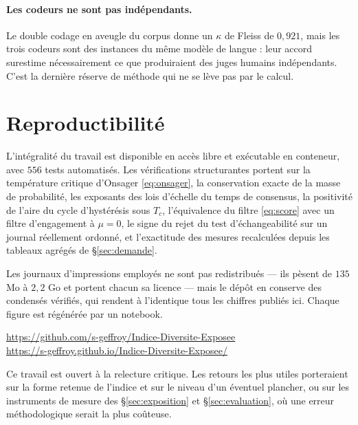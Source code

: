\documentclass[11pt,a4paper]{article}
\begin{document}
\paragraph{Les codeurs ne sont pas indépendants.} Le double codage en aveugle du corpus donne
un $\kappa$ de Fleiss de $0{,}921$, mais les trois codeurs sont des instances du même modèle de
langue : leur accord surestime nécessairement ce que produiraient des juges humains
indépendants. C'est la dernière réserve de méthode qui ne se lève pas par le calcul.

\section{Reproductibilité}

L'intégralité du travail est disponible en accès libre et exécutable en conteneur, avec $556$
tests automatisés. Les vérifications structurantes portent sur la température critique
d'Onsager \eqref{eq:onsager}, la conservation exacte de la masse de probabilité, les exposants
des lois d'échelle du temps de consensus, la positivité de l'aire du cycle d'hystérésis sous
$T_c$, l'équivalence du filtre \eqref{eq:score} avec un filtre d'engagement à $\mu = 0$, le
signe du rejet du test d'échangeabilité sur un journal réellement ordonné, et l'exactitude des
mesures recalculées depuis les tableaux agrégés de \S\ref{sec:demande}.

Les journaux d'impressions employés ne sont pas redistribués --- ils pèsent de $135$ Mo à
$2{,}2$ Go et portent chacun sa licence --- mais le dépôt en conserve des condensés vérifiés,
qui rendent à l'identique tous les chiffres publiés ici. Chaque figure est régénérée par un
notebook.

\begin{center}
\url{https://github.com/s-geffroy/Indice-Diversite-Exposee}\\
\url{https://s-geffroy.github.io/Indice-Diversite-Exposee/}
\end{center}

Ce travail est ouvert à la relecture critique. Les retours les plus utiles porteraient sur la
forme retenue de l'indice et sur le niveau d'un éventuel plancher, ou sur les instruments de
mesure des \S\ref{sec:exposition} et \S\ref{sec:evaluation}, où une erreur méthodologique
serait la plus coûteuse.


\end{document}
